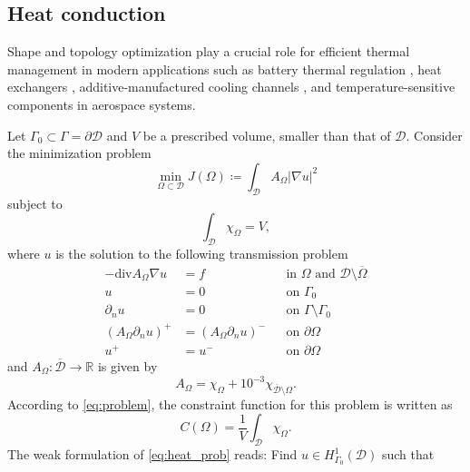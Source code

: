 \documentclass[iicol,pdflatex,sn-mathphys-ay]{sn-jnl}%
\theoremstyle{thmstyleone}%
\theoremstyle{thmstyletwo}%
\theoremstyle{thmstylethree}%
\begin{document}
\subsection{Heat conduction}\label{sub:heat}

Shape and topology optimization play a crucial role
for efficient thermal management 
in modern applications such as battery thermal regulation \citep{Mo2021},
heat exchangers \citep{GAO2008805},
additive-manufactured cooling channels \citep{LamarcheGagnon2024}, and
temperature-sensitive components in aerospace systems.

Let $\Gamma_0\subset\Gamma=\partial\mathcal{D}$ and  $V$ be a prescribed volume,
smaller than that of $\mathcal{D}$.
Consider the minimization problem
\begin{equation}\label{eq:heat_cost}
	\min_{\Omega\subset\mathcal{D}}
	J(\Omega)\coloneqq\int_{\mathcal{D}} A_{\Omega}|\nabla u|^{2}
\end{equation}
subject to
\begin{equation}
	\int_{\mathcal{D}} \chi_{\Omega} = V,
\end{equation}
where $u$ is the solution to the following transmission problem
\begin{equation} \label{eq:heat_prob}
\begin{aligned}
-\mathrm{div} A_{\Omega} \nabla u &= f && \text{in } \Omega \text{ and } \mathcal{D}\setminus\overline{\Omega}\\
								u &= 0 && \text{on } \Gamma_{0}\\
					\partial_{n} u &= 0 && \text{on } \Gamma\setminus\Gamma_{0}\\
	(A_{\Omega} \partial_{n} u)^+ &= (A_{\Omega} \partial_{n} u)^- && \text{on }  \partial\Omega\\
								u^+ &= u^- && \text{on }  \partial\Omega        
\end{aligned}	
\end{equation}
and $A_{\Omega}\colon\overline{\mathcal{D}}\to\mathds{R}$ is given by
\begin{equation}\label{eq:heat_AOmega}
	A_{\Omega} = \chi_{\Omega} +
	{10}^{-3}\chi_{\overline{\mathcal{D}}\setminus\Omega}.
\end{equation}
According to \eqref{eq:problem}, the constraint function for this problem
is written as
\begin{equation}
	C(\Omega) = \frac{1}{V} \int_{\mathcal{D}} \chi_{\Omega}.
\end{equation}
The weak formulation of \eqref{eq:heat_prob} reads:
Find $u\in H^1_{\Gamma_0}(\mathcal{D})$ such that
\end{document}
